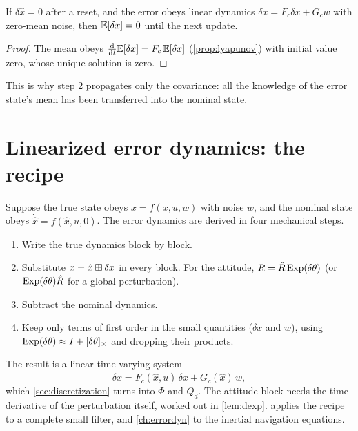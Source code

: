 \begin{proposition}
If $\delta\hat x = 0$ after a reset, and the error obeys linear dynamics $\dot{\delta x} = F_c\delta x + G_cw$ with zero-mean noise, then $\mathbb{E}[\delta x] = 0$ until the
next update.
\end{proposition}
\begin{proof}
The mean obeys $\frac{\mathrm{d}}{\mathrm{d} t}\mathbb{E}[\delta x] = F_c\,\mathbb{E}[\delta x]$ (\cref{prop:lyapunov}) with initial value zero, whose unique solution is zero.
\end{proof}

This is why step 2 propagates only the covariance: all the knowledge of the error state's mean has been transferred into the nominal state.

\section{Linearized error dynamics: the recipe}
\label{sec:error-dyn-recipe}

Suppose the true state obeys $\dot x = f(x, u, w)$ with noise $w$, and the nominal state obeys $\dot{\hat x} = f(\hat x, u, 0)$. The error dynamics are
derived in four mechanical steps.
\begin{enumerate}
  \item Write the true dynamics block by block.
  \item Substitute $x = \hat x\boxplus\delta x$ in every block. For the attitude, $R = \hat R\operatorname{Exp}(\delta\theta)$ (or $\operatorname{Exp}(\delta\theta)\hat R$ for a global perturbation).
  \item Subtract the nominal dynamics.
  \item Keep only terms of first order in the small quantities ($\delta x$ and $w$), using $\operatorname{Exp}(\delta\theta) \approx I + [\delta\theta]_{\times}$ and dropping their
        products.
\end{enumerate}
The result is a linear time-varying system
\begin{equation}
  \dot{\delta x} = F_c(\hat x, u)\,\delta x + G_c(\hat x)\,w,
\end{equation}
which \cref{sec:discretization} turns into $\Phi$ and $Q_d$. The attitude block needs the time derivative of the perturbation itself, worked out in
\cref{lem:dexp}.  applies the recipe to a complete small filter, and \cref{ch:errordyn} to the inertial navigation equations.

